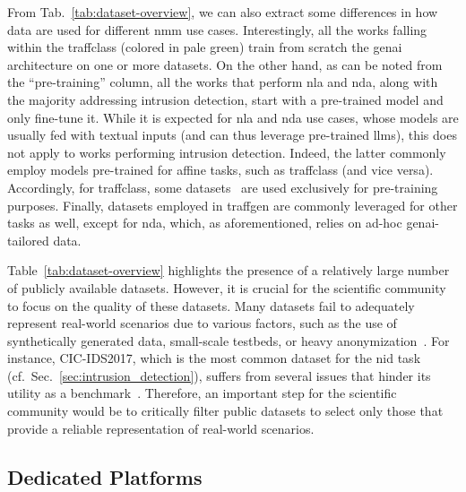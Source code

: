 From Tab.~\ref{tab:dataset-overview}, we can also extract some differences in how data are used for different \gls{nmm} use cases.
Interestingly, all the works falling within the \gls{traffclass} (colored in pale green) train from scratch the \gls{genai} architecture on one or more datasets.
On the other hand, as can be noted from the ``pre-training'' column, all the works that perform \gls{nla} and \gls{nda}, along with the majority addressing intrusion detection, start with a pre-trained model and only fine-tune it.
While it is expected for \gls{nla} and \gls{nda} use cases, whose models are usually fed with textual inputs (and can thus leverage pre-trained \glspl{llm}), this does not apply to works performing intrusion detection.
Indeed, the latter commonly employ models pre-trained for affine tasks,
%
such as 
%
\gls{traffclass} (and vice versa). 
Accordingly, for \gls{traffclass}, some datasets~\cite{sharafaldin2018toward,neto2023ciciot2023} are used exclusively for pre-training purposes. 
Finally, datasets 
%
employed
%
in \gls{traffgen} are commonly leveraged for other tasks as well, except for \gls{nda}, which, as aforementioned, relies on ad-hoc \gls{genai}-tailored data.

%
Table~\ref{tab:dataset-overview} highlights the presence of a relatively large number of publicly available datasets.
However, it is crucial for the scientific community to focus on the quality of these datasets.
Many datasets fail to adequately represent real-world scenarios due to various factors, such as the use of synthetically generated data, small-scale testbeds, or heavy anonymization~\cite{jacobs2022ai}.
For instance, CIC-IDS2017, which is the most common dataset for the \gls{nid} task (cf.~Sec.~\ref{sec:intrusion_detection}), suffers from several issues that hinder its utility as a benchmark~\cite{engelen2021troubleshooting}.
Therefore, an important step for the scientific community would be to critically filter public datasets to select only those that provide a reliable representation of real-world scenarios.
%






















\subsection{Dedicated Platforms}
\label{subsec:platforms}


